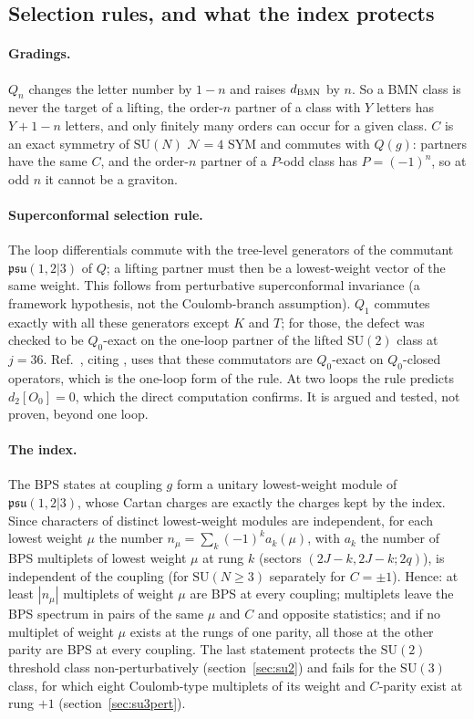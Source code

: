 \documentclass[11pt]{article}
\newcommand{\SU}{\mathrm{SU}}
\newcommand{\cN}{\mathcal{N}}
\begin{document}
\subsection{Selection rules, and what the index protects}\label{sec:selection}

\paragraph{Gradings.} $Q_n$ changes the letter number by $1-n$ and raises $d_{\rm BMN}$ by $n$. So a BMN class is never
the target of a lifting, the order-$n$ partner of a class with $Y$ letters has $Y+1-n$ letters, and only finitely many
orders can occur for a given class. $C$ is an exact symmetry of $\SU(N)$ $\cN=4$ SYM and commutes with $Q(g)$: partners
have the same $C$, and the order-$n$ partner of a $P$-odd class has $P=(-1)^n$, so at odd $n$ it cannot be a graviton.

\paragraph{Superconformal selection rule.} The loop differentials commute with the tree-level generators of the
commutant $\mathfrak{psu}(1,2|3)$ of $Q$; a lifting partner must then be a lowest-weight vector of the same weight. This
follows from perturbative superconformal invariance (a framework hypothesis, not the Coulomb-branch assumption). $Q_1$
commutes exactly with all these generators except $K$ and $T$; for those, the defect was checked to be $Q_0$-exact on
the one-loop partner of the lifted $\SU(2)$ class at $j=36$. Ref.~\cite[sec.~6.1]{KVM}, citing \cite{BK}, uses that
these commutators are $Q_0$-exact on $Q_0$-closed operators, which is the one-loop form of the rule. At two loops the rule predicts $d_2[O_0]=0$, which the
direct computation confirms. It is argued and tested, not proven, beyond one loop.

\paragraph{The index.} The BPS states at coupling $g$ form a unitary lowest-weight module of $\mathfrak{psu}(1,2|3)$,
whose Cartan charges are exactly the charges kept by the index. Since characters of distinct lowest-weight modules are
independent, for each lowest weight $\mu$ the number $n_\mu=\sum_k(-1)^ka_k(\mu)$, with $a_k$ the number of BPS
multiplets of lowest weight $\mu$ at rung $k$ (sectors $(2J-k,2J-k;2q)$), is independent of the coupling (for
$\SU(N\ge3)$ separately for $C=\pm1$). Hence: at least $|n_\mu|$ multiplets of weight $\mu$ are BPS at every coupling;
multiplets leave the BPS spectrum in pairs of the same $\mu$ and $C$ and opposite statistics; and if no multiplet of
weight $\mu$ exists at the rungs of one parity, all those at the other parity are BPS at every coupling. The last
statement protects the $\SU(2)$ threshold class non-perturbatively (section~\ref{sec:su2}) and fails for the $\SU(3)$
class, for which eight Coulomb-type multiplets of its weight and $C$-parity exist at rung $+1$
(section~\ref{sec:su3pert}).
\end{document}
